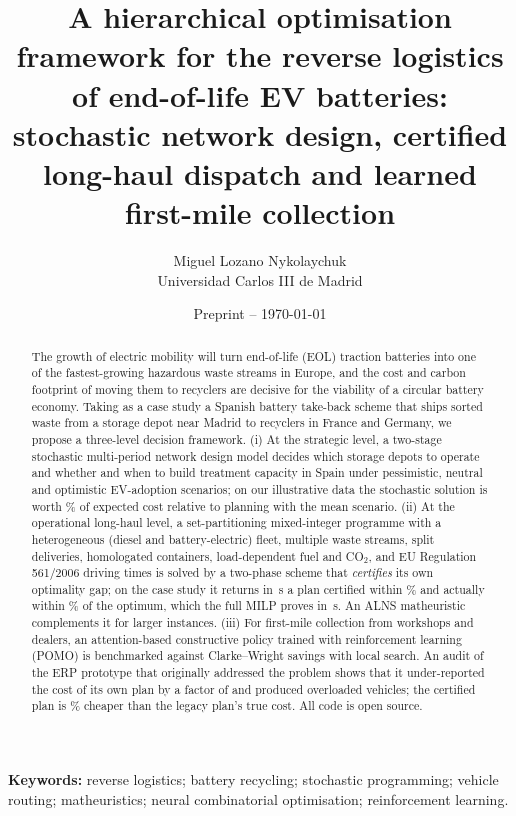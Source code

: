 \documentclass[11pt,a4paper]{article}
\title{\textbf{A hierarchical optimisation framework for the reverse logistics of end-of-life EV batteries:}\\[2pt]
stochastic network design, certified long-haul dispatch and learned first-mile collection}
\author{Miguel Lozano Nykolaychuk\\{\small Universidad Carlos III de Madrid}}
\date{\small Preprint -- \today}
\begin{document}
\maketitle

\begin{abstract}
The growth of electric mobility will turn end-of-life (EOL) traction batteries into one of the fastest-growing hazardous waste streams in Europe, and the cost and carbon footprint of moving them to recyclers are decisive for the viability of a circular battery economy. Taking as a case study a Spanish battery take-back scheme that ships sorted waste from a storage depot near Madrid to recyclers in France and Germany, we propose a three-level decision framework.
(i) At the strategic level, a two-stage stochastic multi-period network design model decides which storage depots to operate and whether and when to build treatment capacity in Spain under pessimistic, neutral and optimistic EV-adoption scenarios; on our illustrative data the stochastic solution is worth \VSSpct\% of expected cost relative to planning with the mean scenario.
(ii) At the operational long-haul level, a set-partitioning mixed-integer programme with a heterogeneous (diesel and battery-electric) fleet, multiple waste streams, split deliveries, homologated containers, load-dependent fuel and CO$_2$, and EU Regulation 561/2006 driving times is solved by a two-phase scheme that \emph{certifies} its own optimality gap; on the case study it returns in \EoneTPsec\,s a plan certified within \EoneTPcert\% and actually within \EoneTPgap\% of the optimum, which the full MILP proves in \EoneFullSec\,s. An ALNS matheuristic complements it for larger instances.
(iii) For first-mile collection from workshops and dealers, an attention-based constructive policy trained with reinforcement learning (POMO) is benchmarked against Clarke--Wright savings with local search.
An audit of the ERP prototype that originally addressed the problem shows that it under-reported the cost of its own plan by a factor of \LegacyFactor{} and produced overloaded vehicles; the certified plan is \EoneSavingPct\% cheaper than the legacy plan's true cost. All code is open source.
\end{abstract}

\noindent\textbf{Keywords:} reverse logistics; battery recycling; stochastic programming; vehicle routing; matheuristics; neural combinatorial optimisation; reinforcement learning.

\end{document}
